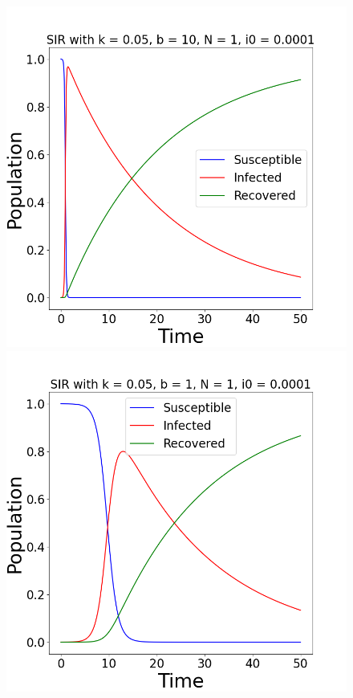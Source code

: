 \documentclass[12pt, reqno]{amsart}
\begin{document}
    \begin{figure}[h]
        \centering
        \begin{minipage}[b]{0.4 \textwidth}
            \includegraphics[width=\textwidth]{sir_ode_simulation0.png}
            \caption{}
            \label{fig:simulation0}
        \end{minipage}
        \hfill
        \begin{minipage}[b]{0.4 \textwidth}
            \includegraphics[width=\textwidth]{sir_ode_simulation1.png}
            \caption{}
            \label{fig:simulation1}
        \end{minipage}
        
    \end{figure}
\end{document}
